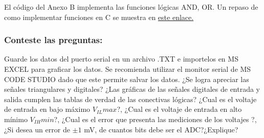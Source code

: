 El código del Anexo B implementa las funciones lógicas AND, OR. Un repaso de como implementar funciones en C se muestra en \href{https://aprendiendoarduino.wordpress.com/2016/11/16/funciones-definidas-por-usuario-2/}{este enlace.} 

\subsubsection{Conteste las preguntas:}

Guarde los datos del puerto serial en un archivo .TXT e importelos en MS EXCEL para graficar los datos.
Se recomienda utilizar el monitor serial de MS CODE STUDIO dado que este permite salvar los datos.
¿Se logra apreciar las señales triangulares y digitales?
¿Las gráficas de las señales digitales de entrada y salida cumplen las tablas de verdad de las conectivas lógicas?
¿Cual es el voltaje de entrada en bajo máximo $V_{IL} max$?,
¿Cual es el voltaje de entrada en alto mínimo $V_{IH} min$?,
¿Cual es el error que presenta las mediciones de los voltajes ?,
¿Si desea un error de $\pm1$ mV, de cuantos bits debe ser el ADC?¿Explique?